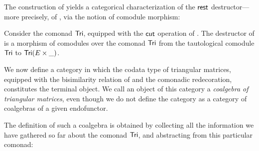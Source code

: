 \documentclass[conference,10pt]{IEEEtran}
\begin{document}
The construction of  yields a categorical characterization of the $\mathsf{rest}$ destructor---%
more precisely, of , via the notion of comodule morphism:


\begin{example}\label{ex:tail_comodule}
 Consider the comonad $\mathsf{Tri}$, equipped with the $\mathsf{cut}$ operation of .
 The destructor \constfont{\tail} of  is a morphism of comodules over the comonad $\mathsf{Tri}$ 
  from the tautological comodule  $\mathsf{Tri}$ to $\mathsf{Tri}(E\times \_)$.
\end{example}








We now define a category in which the codata type of triangular matrices, equipped with the bisimilarity relation of 
and the comonadic redecoration, constitutes the terminal object. We call an object of this category a \emph{coalgebra of triangular matrices}, 
even though we do not define the category as a category of coalgebras of a given endofunctor.

The definition of such a coalgebra is obtained by collecting all the information we have gathered so
far about the comonad $\mathsf{Tri}$, and abstracting from this particular comonad:
\end{document}
